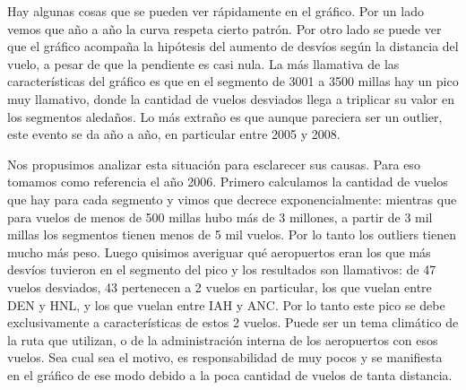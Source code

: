 Hay algunas cosas que se pueden ver rápidamente en el gráfico. 
Por un lado vemos que año a año la curva respeta cierto patrón. 
Por otro lado se puede ver que el gráfico acompaña la hipótesis del aumento de desvíos según la distancia del vuelo, a pesar de que la pendiente es casi nula.
La más llamativa de las características del gráfico es que en el segmento de 3001 a 3500 millas hay un pico muy llamativo, donde la cantidad de vuelos desviados llega a triplicar su valor en los segmentos aledaños. Lo más extraño es que aunque pareciera ser un outlier, este evento se da año a año, en particular entre 2005 y 2008.

Nos propusimos analizar esta situación para esclarecer sus causas. Para eso tomamos como referencia el año 2006. Primero calculamos la cantidad de vuelos que hay para cada segmento y vimos que decrece exponencialmente: mientras que para vuelos de menos de 500 millas hubo más de 3 millones, a partir de 3 mil millas los segmentos tienen menos de 5 mil vuelos. Por lo tanto los outliers tienen mucho más peso. Luego quisimos averiguar qué aeropuertos eran los que más desvíos tuvieron en el segmento del pico y los resultados son llamativos: de 47 vuelos desviados, 43 pertenecen a 2 vuelos en particular, los que vuelan entre DEN y HNL, y los que vuelan entre IAH y ANC.
Por lo tanto este pico se debe exclusivamente a características de estos 2 vuelos. Puede ser un tema climático de la ruta que utilizan, o de la administración interna de los aeropuertos con esos vuelos. Sea cual sea el motivo, es responsabilidad de muy pocos y se manifiesta en el gráfico de ese modo debido a la poca cantidad de vuelos de tanta distancia.



